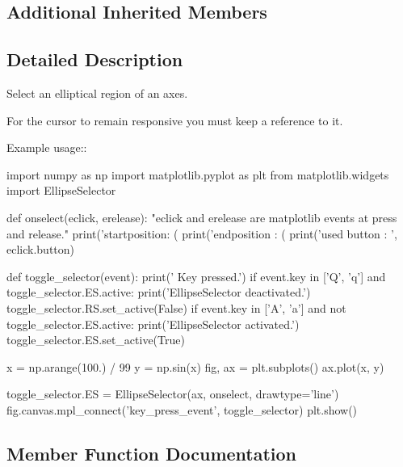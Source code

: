\subsection*{Additional Inherited Members}


\subsection{Detailed Description}
\begin{DoxyVerb}Select an elliptical region of an axes.

For the cursor to remain responsive you must keep a reference to it.

Example usage::

    import numpy as np
    import matplotlib.pyplot as plt
    from matplotlib.widgets import EllipseSelector

    def onselect(eclick, erelease):
        "eclick and erelease are matplotlib events at press and release."
        print('startposition: (%
        print('endposition  : (%
        print('used button  : ', eclick.button)

    def toggle_selector(event):
        print(' Key pressed.')
        if event.key in ['Q', 'q'] and toggle_selector.ES.active:
            print('EllipseSelector deactivated.')
            toggle_selector.RS.set_active(False)
        if event.key in ['A', 'a'] and not toggle_selector.ES.active:
            print('EllipseSelector activated.')
            toggle_selector.ES.set_active(True)

    x = np.arange(100.) / 99
    y = np.sin(x)
    fig, ax = plt.subplots()
    ax.plot(x, y)

    toggle_selector.ES = EllipseSelector(ax, onselect, drawtype='line')
    fig.canvas.mpl_connect('key_press_event', toggle_selector)
    plt.show()
\end{DoxyVerb}
 

\subsection{Member Function Documentation}
\mbox{\label{classmatplotlib_1_1widgets_1_1EllipseSelector_ac1b1fad4c46fe7a6172e44312f33fb92}} 
